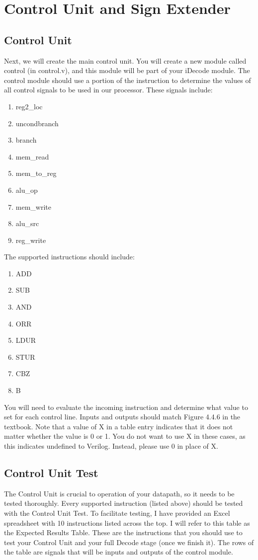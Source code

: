 \chapter{Control Unit and Sign Extender}

\section{Control Unit}
Next, we will create the main control unit.  You will create a new module called control (in control.v), and this module will be part of your iDecode module.  The control module should use a portion of the instruction to determine the values of all control signals to be used in our processor.  These signals include:
\begin{enumerate}
\item reg2\_loc
\item uncondbranch
\item branch
\item mem\_read
\item mem\_to\_reg
\item alu\_op
\item mem\_write
\item alu\_src
\item reg\_write
\end{enumerate}

The supported instructions should include:
\begin{enumerate}
	\item ADD
	\item SUB
	\item AND
	\item ORR
	\item LDUR
	\item STUR
	\item CBZ
	\item B
\end{enumerate}

You will need to evaluate the incoming instruction and determine what value to set for each control line.  Inputs and outputs should match Figure 4.4.6 in the textbook.  Note that a value of X in a table entry indicates that it does not matter whether the value is 0 or 1.  You do not want to use X in these cases, as this indicates undefined to Verilog.  Instead, please use 0 in place of X.

\section{Control Unit Test}
The Control Unit is crucial to operation of your datapath, so it needs to be tested thoroughly.  Every supported instruction (listed above) should be tested with the Control Unit Test.  To facilitate testing, I have provided an Excel spreadsheet with 10 instructions listed across the top.  I will refer to this table as the Expected Results Table.  These are the instructions that you should use to test your Control Unit and your full Decode stage (once we finish it).  The rows of the table are signals that will be inputs and outputs of the control module.  

